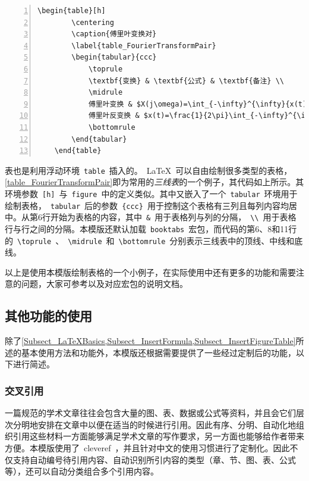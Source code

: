 \begin{Verbatim}[gobble=1,frame=single,numbers=left]
	\begin{table}[h]
		\centering
		\caption{傅里叶变换对}
		\label{table_FourierTransformPair}
		\begin{tabular}{ccc}
			\toprule
			\textbf{变换} & \textbf{公式} & \textbf{备注} \\
			\midrule
			傅里叶变换 & $X(j\omega)=\int_{-\infty}^{\infty}{x(t)e^{-j\omega t}}dt$ & 无 \\
			傅里叶反变换 & $x(t)=\frac{1}{2\pi}\int_{-\infty}^{\infty}{X(j\omega)e^{j\omega t}}d\omega$ & 无 \\
			\bottomrule
		\end{tabular}
	\end{table}
\end{Verbatim}


表也是利用浮动环境~\verb|table|~插入的。~\LaTeX~可以自由绘制很多类型的表格，\cref{table_FourierTransformPair}即为常用的\emph{三线表}的一个例子，其代码如上所示。其环境参数~\verb|[h]|~与~\verb|figure|~中的定义类似。其中又嵌入了一个~\verb|tabular|~环境用于绘制表格，~\verb|tabular|~后的参数~\verb|{ccc}|~用于控制这个表格有三列且每列内容均居中。从第6行开始为表格的内容，其中~\verb|&|~用于表格列与列的分隔，~\verb|\\|~用于表格行与行之间的分隔。本模版还默认加载~\verb|booktabs|~宏包，而代码的第6、8和11行的~\verb|\toprule|~、~\verb|\midrule|~和~\verb|\bottomrule|~分别表示三线表中的顶线、中线和底线。


以上是使用本模版绘制表格的一个小例子，在实际使用中还有更多的功能和需要注意的问题，大家可参考以及对应宏包的说明文档。

\subsection{其他功能的使用}
\label{Subsect_OtherFunctions}
除了\cref{Subsect_LaTeXBasics,Subsect_InsertFormula,Subsect_InsertFigureTable}所述的基本使用方法和功能外，本模版还根据需要提供了一些经过定制后的功能，以下进行简述。
\subsubsection{交叉引用}
\label{Subsubsect_CrossRef}
一篇规范的学术文章往往会包含大量的图、表、数据或公式等资料，并且会它们层次分明地安排在文章中以便在适当的时候进行引用。因此有序、分明、自动化地组织引用这些材料一方面能够满足学术文章的写作要求，另一方面也能够给作者带来方便。本模版使用了~cleveref\cite{Packages_cleveref}~，并且针对中文的使用习惯进行了定制化。因此不仅支持自动编号待引用内容、自动识别所引内容的类型（章、节、图、表、公式等），还可以自动分类组合多个引用内容。


